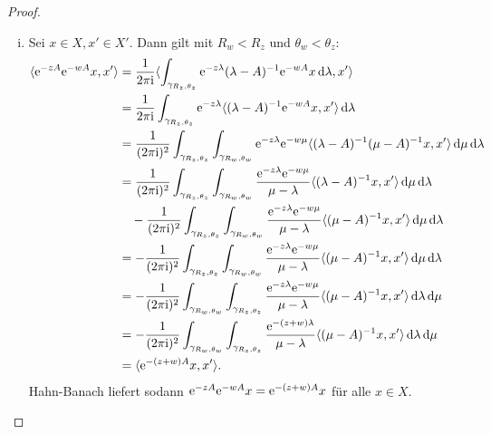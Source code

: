 \begin{proof}
\begin{enumerate}[(i)]
    \item Sei $x \in X, x' \in X'$.
      Dann gilt mit $R_w < R_z$ und $\theta_w < \theta_z$:
      \begin{align*}
        \langle \e^{-zA} \e^{-wA} x, x' \rangle
        &= \frac{1}{2\pi \ii} \langle \int_{\gamma_{R_z, \theta_z}} \e^{-z\lambda} (\lambda - A)^{-1} \e^{-wA} x \d \lambda, x' \rangle \\
        &= \frac{1}{2\pi \ii} \int_{\gamma_{R_z, \theta_z}} \e^{-z\lambda} \langle (\lambda - A)^{-1} \e^{-wA} x, x' \rangle \d \lambda\\
        &= \frac{1}{(2\pi \ii)^2} \int_{\gamma_{R_z, \theta_z}} \int_{\gamma_{R_w, \theta_w}}  \e^{-z\lambda} \e^{-w \mu} \langle (\lambda - A)^{-1} (\mu - A)^{-1} x, x' \rangle \d \mu \d \lambda\\
        &= \frac{1}{(2\pi \ii)^2} \int_{\gamma_{R_z, \theta_z}} \int_{\gamma_{R_w, \theta_w}}  \frac{\e^{-z\lambda} \e^{-w \mu}}{\mu - \lambda} \langle (\lambda - A)^{-1} x, x' \rangle \d \mu \d \lambda\\
        &\quad - \frac{1}{(2\pi \ii)^2} \int_{\gamma_{R_z, \theta_z}} \int_{\gamma_{R_w, \theta_w}}  \frac{\e^{-z\lambda} \e^{-w \mu}}{\mu - \lambda} \langle (\mu - A)^{-1} x, x' \rangle \d \mu \d \lambda\\
        &= - \frac{1}{(2\pi \ii)^2} \int_{\gamma_{R_z, \theta_z}} \int_{\gamma_{R_w, \theta_w}}  \frac{\e^{-z\lambda} \e^{-w \mu}}{\mu - \lambda} \langle (\mu - A)^{-1} x, x' \rangle \d \mu \d \lambda\\
        &= - \frac{1}{(2\pi \ii)^2} \int_{\gamma_{R_w, \theta_w}} \int_{\gamma_{R_z, \theta_z}}  \frac{\e^{-z\lambda} \e^{-w \mu}}{\mu - \lambda} \langle (\mu - A)^{-1} x, x' \rangle \d \lambda \d \mu \\
        &= - \frac{1}{(2\pi \ii)^2} \int_{\gamma_{R_w, \theta_w}} \int_{\gamma_{R_z, \theta_z}}  \frac{\e^{-(z+ w)\lambda}}{\mu - \lambda} \langle (\mu - A)^{-1} x, x' \rangle \d \lambda \d \mu\\
        &= \langle \e^{-(z + w)A} x, x' \rangle.
      \end{align*}
      Hahn-Banach liefert sodann $\mathrm{e}^{-zA}\mathrm{e}^{-wA} x = \mathrm{e}^{-(z + w)A}x$ für alle $x \in X$. 


\end{enumerate}
\end{proof}
